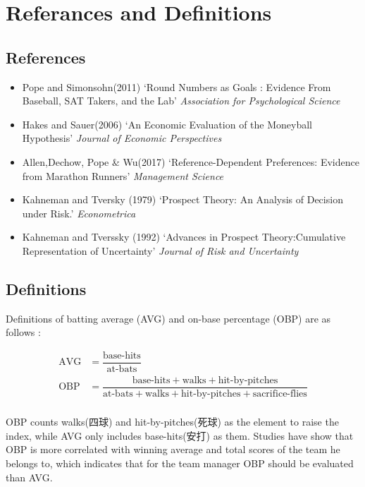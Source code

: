 \documentclass{jsarticle}[12pt]
\begin{document}
\section{Referances and Definitions}

 \subsection{References}
 
  \begin{itemize}
  
  \item Pope and Simonsohn(2011) `Round Numbers as Goals : Evidence From Baseball, SAT Takers,
and the Lab'  \textit{Association for Psychological Science}
  
  \item Hakes and Sauer(2006) `An Economic Evaluation of the Moneyball Hypothesis' \textit{Journal of Economic Perspectives}
  
  \item Allen,Dechow, Pope \& Wu(2017) `Reference-Dependent Preferences: Evidence from
Marathon Runners' \textit{Management Science}
  
  \item Kahneman and Tversky (1979) `Prospect Theory: An Analysis of Decision under Risk.' \textit{Econometrica}
  
  \item Kahneman and Tverssky (1992) `Advances in Prospect Theory:Cumulative Representation of Uncertainty'  \textit{Journal of Risk and Uncertainty}
  
  \end{itemize}
 
 \subsection{Definitions}
 
 Definitions of batting average (AVG) and on-base percentage (OBP) are as follows :
 
 \begin{align*}
\text{AVG} &= \dfrac{\text{base-hits}}{\text{at-bats}} \\
\text{OBP} &= \dfrac{\text{base-hits} + \text{walks} + \text{hit-by-pitches}} 
{\text{at-bats} + \text{walks} + \text{hit-by-pitches} + \text{sacrifice-flies}} \\
\end{align*}

OBP counts walks(四球) and hit-by-pitches(死球) as the element to raise the index, while AVG only includes base-hits(安打) as them. Studies have show that OBP is more correlated with winning average and total scores of the team he belongs to, which indicates that for the team manager OBP should be evaluated than AVG.
\end{document}
